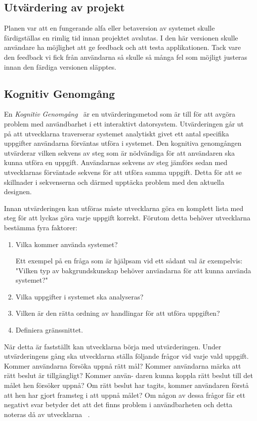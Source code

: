 \documentclass[a4paper, 11pt]{article}
\begin{document}
\subsection{Utvärdering av projekt}
Planen var att en fungerande alfa eller betaversion av systemet skulle färdigställas en rimlig tid innan projektet avslutas. I den här versionen skulle användare ha möjlighet att ge feedback och att testa applikationen. Tack vare den feedback vi fick från användarna så skulle så många fel som möjligt justeras innan den färdiga versionen släpptes.



\subsection{Kognitiv Genomgång}
En \textit{Kognitiv Genomgång}~\cite[sid 2--8]{cognitive} är en utvärderingsmetod som är till för att avgöra problem med användbarhet i ett interaktivt datorsystem. Utvärderingen går ut på att utvecklarna traverserar systemet analytiskt givet ett antal specifika uppgifter användarna förväntas utföra i systemet. Den kognitiva genomgången utvärderar vilken sekvens av steg som är nödvändiga för att användaren ska kunna utföra en uppgift. Användarnas sekvens av steg jämförs sedan med utvecklarnas förväntade sekvens för att utföra samma uppgift. Detta för att se skillnader i sekvenserna och därmed upptäcka problem med den aktuella designen.


Innan utvärderingen kan utföras måste utvecklarna göra en komplett lista med steg för att lyckas göra varje uppgift korrekt. Förutom detta behöver utvecklarna bestämma fyra faktorer:
\begin{enumerate}
\item Vilka kommer använda systemet?

Ett exempel på en fråga som är hjälpsam vid ett sådant val är exempelvis: "Vilken typ av bakgrundskunskap behöver användarna för att kunna använda systemet?"
\item Vilka uppgifter i systemet ska analyseras?
\item Vilken är den rätta ordning av handlingar för att utföra uppgiften?
\item Definiera gränssnittet.
\end{enumerate}

När detta är fastställt kan utvecklarna börja med utvärderingen. Under utvärderingens gång ska utvecklarna ställa följande frågor vid varje vald uppgift. Kommer användarna försöka uppnå rätt mål? Kommer användarna märka att rätt beslut är tillgängligt? Kommer använ-
daren kunna koppla rätt beslut till det målet hen försöker uppnå? Om rätt beslut har tagits, kommer användaren förstå att hen har gjort framsteg i att uppnå målet?
Om någon av dessa frågor får ett negativt svar betyder det att det finns problem i användbarheten och detta noteras då av utvecklarna ~\cite[sid 230--232]{benyon2010designing}.
\end{document}
